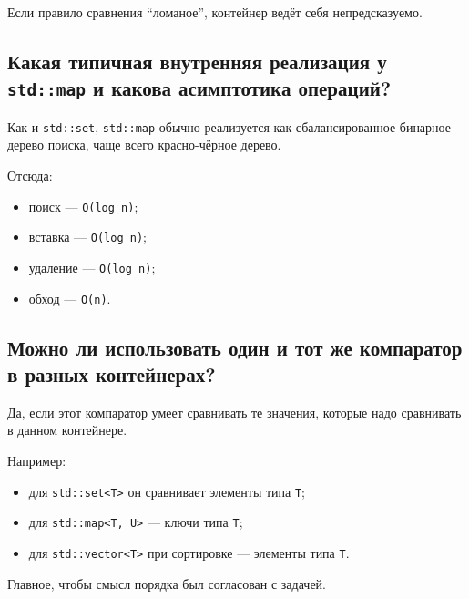 Если правило сравнения ``ломаное'', контейнер ведёт себя непредсказуемо.


\subsection{Какая типичная внутренняя реализация у \texttt{std::map} и какова асимптотика операций?}

Как и \texttt{std::set}, \texttt{std::map} обычно реализуется как сбалансированное бинарное дерево поиска, чаще всего красно-чёрное дерево.

Отсюда:
\begin{itemize}
    \item поиск --- \texttt{O(log n)};
    \item вставка --- \texttt{O(log n)};
    \item удаление --- \texttt{O(log n)};
    \item обход --- \texttt{O(n)}.
\end{itemize}


\subsection{Можно ли использовать один и тот же компаратор в разных контейнерах?}

Да, если этот компаратор умеет сравнивать те значения, которые надо сравнивать в данном контейнере.

Например:
\begin{itemize}
    \item для \texttt{std::set<T>} он сравнивает элементы типа \texttt{T};
    \item для \texttt{std::map<T, U>} --- ключи типа \texttt{T};
    \item для \texttt{std::vector<T>} при сортировке --- элементы типа \texttt{T}.
\end{itemize}

Главное, чтобы смысл порядка был согласован с задачей.
